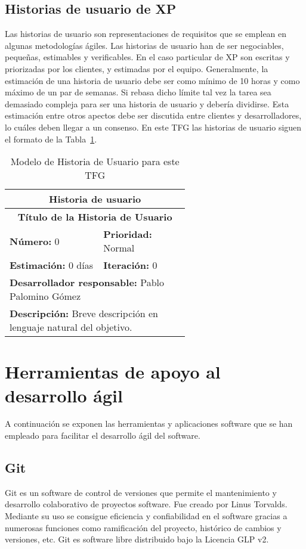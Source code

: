 \subsection{Historias de usuario de XP}
Las historias de usuario son representaciones de requisitos que se emplean en algunas metodologías ágiles. Las historias de usuario han de ser negociables, pequeñas, estimables y verificables. En el caso particular de \gls{XP} son escritas y priorizadas por los clientes, y estimadas por el equipo. Generalmente, la estimación de una historia de usuario debe ser como mínimo de 10 horas y como máximo de un par de semanas. Si rebasa dicho límite tal vez la tarea sea demasiado compleja para ser una historia de usuario y debería dividirse. Esta estimación entre otros apectos debe ser discutida entre clientes y desarrolladores, lo cuáles deben llegar a un consenso. En este \gls{TFG} las historias de usuario siguen el formato de la Tabla~\ref{tab:histModel}.
\begin{table}[H]
        \centering
        \begin{tabular}{|p{0.3\linewidth}|p{0.3\linewidth}|}
          \hline
          \multicolumn{2}{|c|}{Historia de usuario}\\ \hline
          \multicolumn{2}{|c|}{\textbf{Título de la Historia de Usuario}}\\ \hline
          \textbf{Número:} 0  & \textbf{Prioridad:} Normal  \\ \hline
          \textbf{Estimación:} 0 días  & \textbf{Iteración:} 0 \\ \hline
          \multicolumn{2}{|l|}{\textbf{Desarrollador responsable:} Pablo Palomino Gómez}\\ \hline
          \multicolumn{2}{|p{0.6\linewidth}|}{\textbf{Descripción:} Breve descripción en lenguaje natural del objetivo.}\\ \hline
        \end{tabular}
        \caption{Modelo de Historia de Usuario para este TFG}
        \label{tab:histModel}
\end{table}

\section{Herramientas de apoyo al desarrollo ágil}
A continuación se exponen las herramientas y aplicaciones software que se han empleado para facilitar el desarrollo ágil del software.
\subsection{Git}
Git es un software de control de versiones que permite el mantenimiento y desarrollo colaborativo de proyectos software. Fue creado por Linus Torvalds. Mediante su uso se consigue eficiencia y confiabilidad en el software gracias a numerosas funciones como ramificación del proyecto, histórico de cambios y versiones, etc. Git es software libre distribuido bajo la Licencia \gls{GLP} v2.\\
